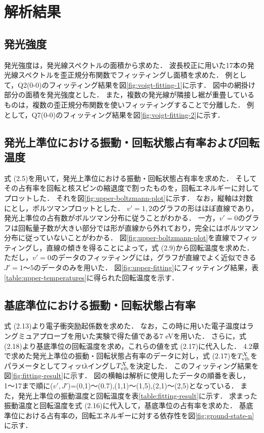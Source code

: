 \chapter{解析結果}

\section{発光強度}
発光強度は，発光線スペクトルの面積から求めた．
波長校正に用いた17本の発光線スペクトルを歪正規分布関数でフィッティングし面積を求めた．
例として，Q2(0-0)のフィッティング結果を図\ref{fig:voigt-fitting-1}に示す．
図中の網掛け部分の面積を発光強度とした．
また，複数の発光線が隣接し裾が重畳しているものは，複数の歪正規分布関数を使いフィッティングすることで分離した．
例として，Q7(0-0)のフィッティング結果を図\ref{fig:voigt-fitting-2}に示す．

\section{発光上準位における振動・回転状態占有率および回転温度}
式 (2.5)を用いて，発光上準位における振動・回転状態占有率を求めた．
そしてその占有率を回転と核スピンの縮退度で割ったものを，回転エネルギーに対してプロットした．
それを図\ref{fig:upper-boltzmann-plot}に示す．
なお，縦軸は対数にとし，ボルツマンプロットとした．
$v'=1,2$のグラフの形はほぼ直線であり，発光上準位の占有数がボルツマン分布に従うことがわかる．
一方，$v'=0$のグラフは回転量子数が大きい部分では形が直線から外れており，完全にはボルツマン分布に従っていないことがわかる．
図\ref{fig:upper-boltzmann-plot}を直線でフィッティングし，直線の傾きを得ることによって，式 (2.9)から回転温度を求めた．
ただし，$v'=0$のデータのフィッティングには，グラフが直線でよく近似できる$J'=1〜5$のデータのみを用いた．
図\ref{fig:upper-fitting}にフィッティング結果，表\ref{table:upper-temperatures}に得られた回転温度を示す．

\section{基底準位における振動・回転状態占有率}
式 (2.13)より電子衝突励起係数を求めた．
なお，この時に用いた電子温度はラングミュアプローブを用いた実験で得た値である7 eV\cite{yun}を用いた．
さらに，式 (2.18)より基底準位の回転温度を求め，これらの値を式 (2.17)に代入した．
4.2章で求めた発光上準位の振動・回転状態占有率のデータに対し，式 (2.17)を$T^X_{\rm vib}$をパラメータとしてフィッtλイングし$T^X_{\rm vib}$を決定した．
このフィッティング結果を図\ref{fig:fitting-result}に示す．
図の横軸は解析に使用したデータの順番を表し，1〜17まで順に($v',J'$)=(0,1)〜(0.7),(1,1)〜(1,5),(2,1)〜(2,5)となっている．
また，発光上準位の振動温度と回転温度を表\ref{table:fitting-result}に示す．
求まった振動温度と回転温度を式 (2.16)に代入して，基底準位の占有率を求めた．
基底準位における占有率の，回転エネルギーに対する依存性を図\ref{fig:ground-state-n}に示す．